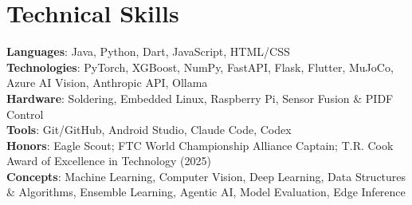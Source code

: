     \resumeSubHeadingListEnd

\section{Technical Skills}
 \begin{itemize}[leftmargin=0.15in, label={}]
    \small{\item{
     \textbf{Languages}{: Java, Python, Dart, JavaScript, HTML/CSS} \\
     \textbf{Technologies}{: PyTorch, XGBoost, NumPy, FastAPI, Flask, Flutter, MuJoCo, Azure AI Vision, Anthropic API, Ollama} \\
     \textbf{Hardware}{: Soldering, Embedded Linux, Raspberry Pi, Sensor Fusion \& PIDF Control} \\
     \textbf{Tools}{: Git/GitHub, Android Studio, Claude Code, Codex} \\
     \textbf{Honors}{: Eagle Scout; FTC World Championship Alliance Captain; T.R. Cook Award of Excellence in Technology (2025)} \\
     \textbf{Concepts}{: Machine Learning, Computer Vision, Deep Learning, Data Structures \& Algorithms, Ensemble Learning, Agentic AI, Model Evaluation, Edge Inference}
    }}
 \end{itemize}
